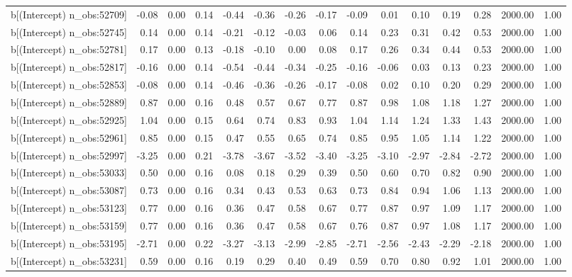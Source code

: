 \begin{table}[ht]
\begin{tabular}{rrrrrrrrrrrrrrr}
  b[(Intercept) n\_obs:52709] & -0.08 & 0.00 & 0.14 & -0.44 & -0.36 & -0.26 & -0.17 & -0.09 & 0.01 & 0.10 & 0.19 & 0.28 & 2000.00 & 1.00 \\ 
  b[(Intercept) n\_obs:52745] & 0.14 & 0.00 & 0.14 & -0.21 & -0.12 & -0.03 & 0.06 & 0.14 & 0.23 & 0.31 & 0.42 & 0.53 & 2000.00 & 1.00 \\ 
  b[(Intercept) n\_obs:52781] & 0.17 & 0.00 & 0.13 & -0.18 & -0.10 & 0.00 & 0.08 & 0.17 & 0.26 & 0.34 & 0.44 & 0.53 & 2000.00 & 1.00 \\ 
  b[(Intercept) n\_obs:52817] & -0.16 & 0.00 & 0.14 & -0.54 & -0.44 & -0.34 & -0.25 & -0.16 & -0.06 & 0.03 & 0.13 & 0.23 & 2000.00 & 1.00 \\ 
  b[(Intercept) n\_obs:52853] & -0.08 & 0.00 & 0.14 & -0.46 & -0.36 & -0.26 & -0.17 & -0.08 & 0.02 & 0.10 & 0.20 & 0.29 & 2000.00 & 1.00 \\ 
  b[(Intercept) n\_obs:52889] & 0.87 & 0.00 & 0.16 & 0.48 & 0.57 & 0.67 & 0.77 & 0.87 & 0.98 & 1.08 & 1.18 & 1.27 & 2000.00 & 1.00 \\ 
  b[(Intercept) n\_obs:52925] & 1.04 & 0.00 & 0.15 & 0.64 & 0.74 & 0.83 & 0.93 & 1.04 & 1.14 & 1.24 & 1.33 & 1.43 & 2000.00 & 1.00 \\ 
  b[(Intercept) n\_obs:52961] & 0.85 & 0.00 & 0.15 & 0.47 & 0.55 & 0.65 & 0.74 & 0.85 & 0.95 & 1.05 & 1.14 & 1.22 & 2000.00 & 1.00 \\ 
  b[(Intercept) n\_obs:52997] & -3.25 & 0.00 & 0.21 & -3.78 & -3.67 & -3.52 & -3.40 & -3.25 & -3.10 & -2.97 & -2.84 & -2.72 & 2000.00 & 1.00 \\ 
  b[(Intercept) n\_obs:53033] & 0.50 & 0.00 & 0.16 & 0.08 & 0.18 & 0.29 & 0.39 & 0.50 & 0.60 & 0.70 & 0.82 & 0.90 & 2000.00 & 1.00 \\ 
  b[(Intercept) n\_obs:53087] & 0.73 & 0.00 & 0.16 & 0.34 & 0.43 & 0.53 & 0.63 & 0.73 & 0.84 & 0.94 & 1.06 & 1.13 & 2000.00 & 1.00 \\ 
  b[(Intercept) n\_obs:53123] & 0.77 & 0.00 & 0.16 & 0.36 & 0.47 & 0.58 & 0.67 & 0.77 & 0.87 & 0.97 & 1.09 & 1.17 & 2000.00 & 1.00 \\ 
  b[(Intercept) n\_obs:53159] & 0.77 & 0.00 & 0.16 & 0.36 & 0.47 & 0.58 & 0.67 & 0.76 & 0.87 & 0.97 & 1.08 & 1.17 & 2000.00 & 1.00 \\ 
  b[(Intercept) n\_obs:53195] & -2.71 & 0.00 & 0.22 & -3.27 & -3.13 & -2.99 & -2.85 & -2.71 & -2.56 & -2.43 & -2.29 & -2.18 & 2000.00 & 1.00 \\ 
  b[(Intercept) n\_obs:53231] & 0.59 & 0.00 & 0.16 & 0.19 & 0.29 & 0.40 & 0.49 & 0.59 & 0.70 & 0.80 & 0.92 & 1.01 & 2000.00 & 1.00 \\ 

\end{tabular}
\end{table}
